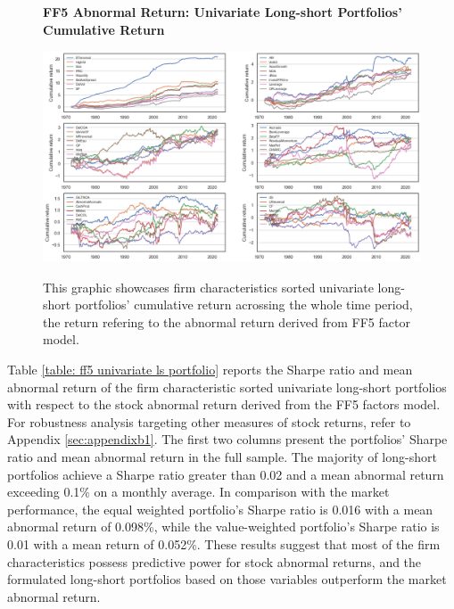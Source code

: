 \begin{figure}[H]
  \centering
  \caption{\textbf{FF5 Abnormal Return: Univariate Long-short Portfolios' Cumulative Return}}
  \includegraphics[width=.8\textwidth]{images/univariate_ls_cum_ret_ff5.png}
  \label{fig: ff5 univariate ls cumulative return}
  \caption*{\footnotesize{This graphic showcases firm characteristics sorted univariate long-short portfolios' cumulative return acrossing the whole time period, the return refering to the abnormal return derived from FF5 factor model.}}
\end{figure}

Table \ref{table: ff5 univariate ls portfolio} reports the Sharpe ratio and mean abnormal return of the firm characteristic sorted univariate long-short portfolios with respect to the stock abnormal return derived from the FF5 factors model. For robustness analysis targeting other measures of stock returns, refer to Appendix \ref{sec:appendixb1}. The first two columns present the portfolios' Sharpe ratio and mean abnormal return in the full sample. The majority of long-short portfolios achieve a Sharpe ratio greater than 0.02 and a mean abnormal return exceeding 0.1\% on a monthly average. In comparison with the market performance, the equal weighted portfolio's Sharpe ratio is 0.016 with a mean abnormal return of 0.098\%, while the value-weighted portfolio's Sharpe ratio is 0.01 with a mean return of 0.052\%. These results suggest that most of the firm characteristics possess predictive power for stock abnormal returns, and the formulated long-short portfolios based on those variables outperform the market abnormal return.

